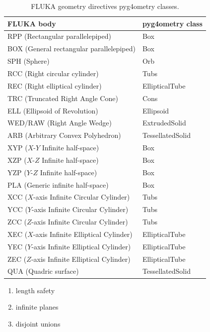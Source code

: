 \documentclass[final,5p,times,twocolumn]{elsarticle}
\begin{document}
\begin{table}[hbt!]
\centering
\begin{tabular}{|l|l|} \hline
FLUKA body						& pyg4ometry class \\ \hline
RPP (Rectangular parallelepiped)			& Box \\
BOX (General rectangular parallelepiped)		& Box \\
SPH (Sphere)    					& Orb \\
RCC (Right circular cylinder)				& Tubs \\
REC (Right elliptical cylinder)				& EllipticalTube \\
TRC (Truncated Right Angle Cone)			& Cons \\
ELL (Ellipsoid of Revolution) 				& Ellipsoid \\
WED/RAW (Right Angle Wedge)		         	& ExtrudedSolid \\
ARB	(Arbitrary Convex Polyhedron)			& TessellatedSolid \\
XYP 	($X$-$Y$ Infinite half-space)			& Box \\
XZP 	($X$-$Z$ Infinite half-space)			& Box \\
YZP 	($Y$-$Z$ Infinite half-space)			& Box \\
PLA (Generic infinite half-space)			& Box \\
XCC ($X$-axis Infinite Circular Cylinder)		& Tubs \\
YCC ($Y$-axis Infinite Circular Cylinder)		& Tubs \\
ZCC 	($Z$-axis Infinite Circular Cylinder)		& Tubs \\
XEC 	($X$-axis Infinite Elliptical Cylinder)		& EllipticalTube \\
YEC 	($Y$-axis Infinite Elliptical Cylinder)		& EllipticalTube \\
ZEC ($Z$-axis Infinite Elliptical Cylinder)		& EllipticalTube \\
QUA (Quadric surface) 					& TessellatedSolid \\ \hline
\end{tabular}
\caption{FLUKA geometry directives pyg4ometry classes.} \label{tab:Fluka2Geant4}
\end{table}

\begin{enumerate} 
\item length safety
\item infinite planes
\item disjoint unions 
\end{enumerate} 
\end{document}
